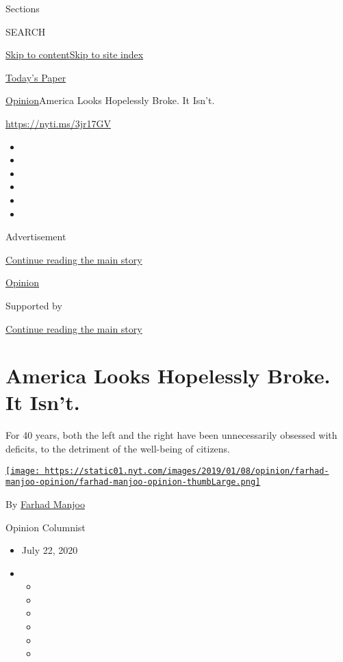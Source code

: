 Sections

SEARCH

\protect\hyperlink{site-content}{Skip to
content}\protect\hyperlink{site-index}{Skip to site index}

\href{https://myaccount.nytimes.com/auth/login?response_type=cookie\&client_id=vi}{}

\href{https://www.nytimes.com/section/todayspaper}{Today's Paper}

\href{/section/opinion}{Opinion}\textbar{}America Looks Hopelessly
Broke. It Isn't.

\href{https://nyti.ms/3jr17GV}{https://nyti.ms/3jr17GV}

\begin{itemize}
\item
\item
\item
\item
\item
\item
\end{itemize}

Advertisement

\protect\hyperlink{after-top}{Continue reading the main story}

\href{/section/opinion}{Opinion}

Supported by

\protect\hyperlink{after-sponsor}{Continue reading the main story}

\hypertarget{america-looks-hopelessly-broke-it-isnt}{%
\section{America Looks Hopelessly Broke. It
Isn't.}\label{america-looks-hopelessly-broke-it-isnt}}

For 40 years, both the left and the right have been unnecessarily
obsessed with deficits, to the detriment of the well-being of citizens.

\href{https://www.nytimes.com/by/farhad-manjoo}{\texttt{[image: https://static01.nyt.com/images/2019/01/08/opinion/farhad-manjoo-opinion/farhad-manjoo-opinion-thumbLarge.png]}}

By \href{https://www.nytimes.com/by/farhad-manjoo}{Farhad Manjoo}

Opinion Columnist

\begin{itemize}
\item
  July 22, 2020
\item
  \begin{itemize}
  \item
  \item
  \item
  \item
  \item
  \item
  \end{itemize}
\end{itemize}

